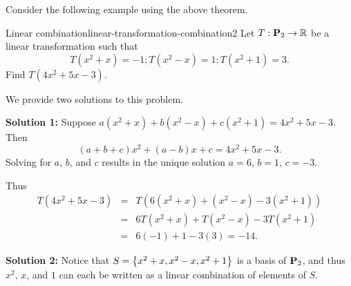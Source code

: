 Consider the following example using the above theorem.

\begin{example}{Linear combination}{linear-transformation-combination2}
  Let $T:\mathbf{P}_2 \to \mathbb{R}$ be a linear transformation such that
  \begin{equation*}
    T(x^2+x)=-1; T(x^2-x)=1; T(x^2+1)=3.
  \end{equation*}
  Find $T(4x^2+5x-3)$.
\end{example}

\begin{solution}
  We provide two solutions to this problem.

  \textbf{Solution 1:}
  Suppose $a(x^2+x) + b(x^2-x) + c(x^2+1) = 4x^2+5x-3$.  Then
  \begin{equation*} (a+b+c)x^2 + (a-b)x + c = 4x^2+5x-3.\end{equation*}
  Solving for $a$, $b$, and $c$ results in the unique solution
  $a=6$, $b=1$, $c=-3$.

  Thus
  \begin{eqnarray*}
    T(4x^2+5x-3)
    & = & T(6(x^2+x) + (x^2-x) -3(x^2+1)) \\
    & = & 6T(x^2+x) + T(x^2-x) -3T(x^2+1) \\
    & = & 6(-1) + 1 -3(3) = -14.
  \end{eqnarray*}

  \textbf{Solution 2:}
  Notice that $S=\left\{x^2+x, x^2-x, x^2+1\right\}$ is a basis of $\mathbf{P}_2$,
  and thus $x^2$, $x$, and $1$ can each be written as a linear
  combination of elements of $S$.


\end{solution}
